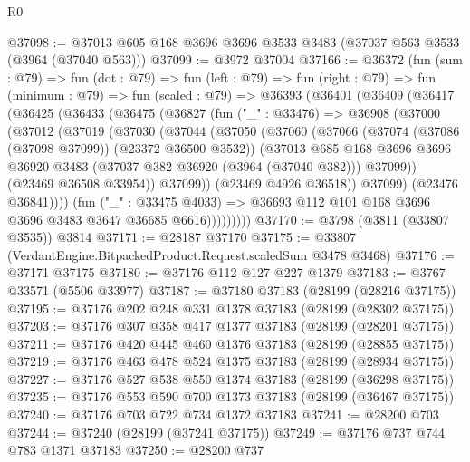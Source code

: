 \begin{lexlean}{R0}
\begin{coremodule}
@37098 := @37013 @605 @168 @3696 @3696 @3533 @3483 (@37037 @563 @3533 (@3964 (@37040 @563)))
@37099 := @3972 @37004
@37166 := @36372
    (fun (sum : @79) =>
    fun (dot : @79) =>
    fun (left : @79) =>
    fun (right : @79) =>
    fun (minimum : @79) =>
    fun (scaled : @79) =>
    @36393
      (@36401
        (@36409
          (@36417
            (@36425
              (@36433
                (@36475
                  (@36827
                    (fun ("_" : @33476) =>
                    @36908
                      (@37000
                        (@37012
                          (@37019
                            (@37030
                              (@37044
                                (@37050
                                  (@37060
                                    (@37066
                                      (@37074 (@37086 (@37098 @37099)) (@23372 @36500 @3532))
                                      (@37013
                                        @685
                                        @168
                                        @3696
                                        @3696
                                        @36920
                                        @3483
                                        (@37037 @382 @36920 (@3964 (@37040 @382)))
                                        @37099))
                                    (@23469 @36508 @33954))
                                  @37099))
                              (@23469 @4926 @36518))
                            @37099)
                          (@23476 @36841))))
                    (fun ("_" : @33475 @4033) =>
                    @36693 @112 @101 @168 @3696 @3696 @3483 @3647 @36685 @6616)))))))))
@37170 := @3798 (@3811 (@33807 @3535)) @3814
@37171 := @28187 @37170
@37175 := @33807 (VerdantEngine.BitpackedProduct.Request.scaledSum @3478 @3468)
@37176 := @37171 @37175
@37180 := @37176 @112 @127 @227 @1379
@37183 := @3767 @33571 (@5506 @33977)
@37187 := @37180 @37183 (@28199 (@28216 @37175))
@37195 := @37176 @202 @248 @331 @1378 @37183 (@28199 (@28302 @37175))
@37203 := @37176 @307 @358 @417 @1377 @37183 (@28199 (@28201 @37175))
@37211 := @37176 @420 @445 @460 @1376 @37183 (@28199 (@28855 @37175))
@37219 := @37176 @463 @478 @524 @1375 @37183 (@28199 (@28934 @37175))
@37227 := @37176 @527 @538 @550 @1374 @37183 (@28199 (@36298 @37175))
@37235 := @37176 @553 @590 @700 @1373 @37183 (@28199 (@36467 @37175))
@37240 := @37176 @703 @722 @734 @1372 @37183
@37241 := @28200 @703
@37244 := @37240 (@28199 (@37241 @37175))
@37249 := @37176 @737 @744 @783 @1371 @37183
@37250 := @28200 @737

\end{coremodule}
\end{lexlean}
